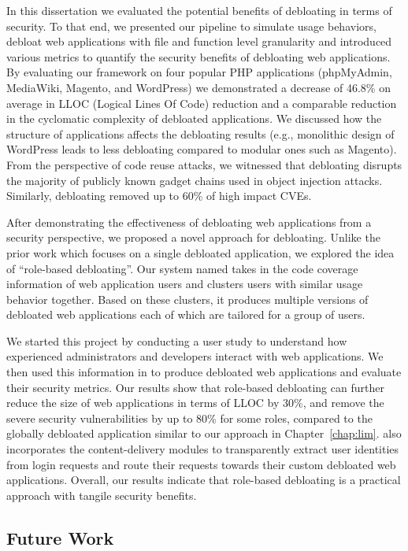 In this dissertation we evaluated the potential benefits of debloating in terms of security. 
To that end, we presented our pipeline to simulate usage behaviors, debloat web applications with file and function level granularity and introduced various metrics to quantify the security benefits of debloating web applications. 
By evaluating our framework on four popular PHP applications (phpMyAdmin, MediaWiki, Magento, and WordPress) we demonstrated a decrease of 46.8\% on average in LLOC (Logical Lines Of Code) reduction and a comparable reduction in the cyclomatic complexity of debloated applications. 
We discussed how the structure of applications affects the debloating results (e.g., monolithic design of WordPress leads to less debloating compared to modular ones such as Magento). 
From the perspective of code reuse attacks, we witnessed that debloating disrupts the majority of publicly known gadget chains used in object injection attacks. 
Similarly, debloating removed up to 60\% of high impact CVEs. 

After demonstrating the effectiveness of debloating web applications from a security perspective, we proposed a novel approach for debloating. 
Unlike the prior work which focuses on a single debloated application, we explored the idea of ``role-based debloating''. 
Our system named \sys{} takes in the code coverage information of web application users and clusters users with similar usage behavior together. 
Based on these clusters, it produces multiple versions of debloated web applications each of which are tailored for a group of users. 

We started this project by conducting a user study to understand how experienced administrators and developers interact with web applications. 
We then used this information in \sys{} to produce debloated web applications and evaluate their security metrics. 
Our results show that role-based debloating can further reduce the size of web applications in terms of LLOC by 30\%, and remove the severe security vulnerabilities by up to 80\% for some roles, compared to the globally debloated application similar to our approach in Chapter~\ref{chap:lim}. 
\sys{} also incorporates the content-delivery modules to transparently extract user identities from login requests and route their requests towards their custom debloated web applications. 
Overall, our results indicate that role-based debloating is a practical approach with tangile security benefits.

\subsection*{Future Work}

